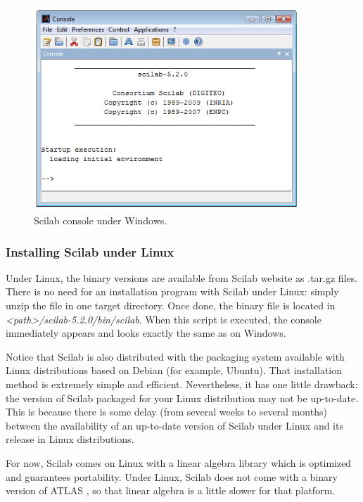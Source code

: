 \begin{figure}
\begin{center}
\includegraphics[width=10cm]{introscilab/win32-scilab-console-5-2-0.png}
\end{center}
\caption{Scilab console under Windows.}
\label{fig-win32-scilab-console}
\end{figure}

\subsubsection{Installing Scilab under Linux}

Under Linux, the binary versions are available from Scilab 
website as .tar.gz files. There is no need for an installation 
program with Scilab under Linux: simply unzip the file in one target 
directory. Once done, the binary file is located in \emph{<path>/scilab-5.2.0/bin/scilab}.
When this script is executed, the console immediately appears and looks 
exactly the same as on Windows.

Notice that Scilab is also distributed with the packaging system available 
with Linux distributions based on Debian (for example, Ubuntu). 
That installation method is extremely simple and efficient. 
Nevertheless, it has one little drawback: the version of Scilab packaged for your Linux distribution
may not be up-to-date. This is because there is some delay (from 
several weeks to several months) between the availability of an up-to-date version 
of Scilab under Linux and its release in Linux 
distributions.

For now, Scilab comes on Linux with a linear algebra library which is optimized 
and guarantees portability.
Under Linux, Scilab does not come with a binary version of ATLAS \cite{AtlasWWW},
so that linear algebra is a little slower for that platform.


